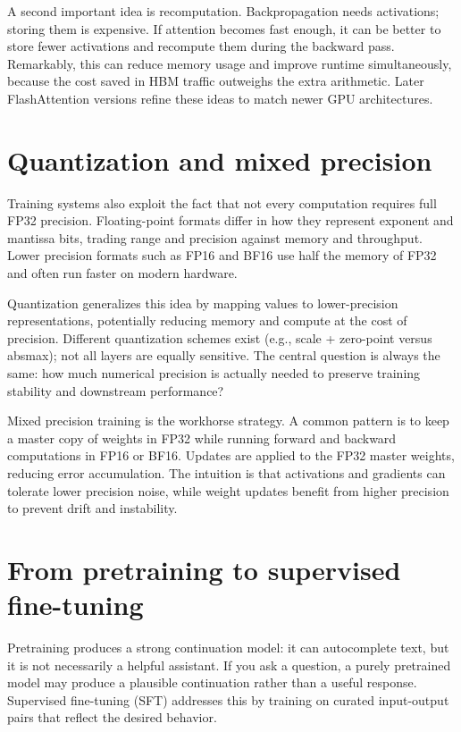 A second important idea is recomputation. Backpropagation needs activations; storing them is expensive. If attention becomes fast enough, it can be better to store fewer activations and recompute them during the backward pass. Remarkably, this can reduce memory usage and improve runtime simultaneously, because the cost saved in HBM traffic outweighs the extra arithmetic. Later FlashAttention versions refine these ideas to match newer GPU architectures.

\section{Quantization and mixed precision}
Training systems also exploit the fact that not every computation requires full FP32 precision. Floating-point formats differ in how they represent exponent and mantissa bits, trading range and precision against memory and throughput. Lower precision formats such as FP16 and BF16 use half the memory of FP32 and often run faster on modern hardware.

Quantization generalizes this idea by mapping values to lower-precision representations, potentially reducing memory and compute at the cost of precision. Different quantization schemes exist (e.g., scale + zero-point versus absmax); not all layers are equally sensitive. The central question is always the same: how much numerical precision is actually needed to preserve training stability and downstream performance?

Mixed precision training is the workhorse strategy. A common pattern is to keep a master copy of weights in FP32 while running forward and backward computations in FP16 or BF16. Updates are applied to the FP32 master weights, reducing error accumulation. The intuition is that activations and gradients can tolerate lower precision noise, while weight updates benefit from higher precision to prevent drift and instability.

\section{From pretraining to supervised fine-tuning}
Pretraining produces a strong continuation model: it can autocomplete text, but it is not necessarily a helpful assistant. If you ask a question, a purely pretrained model may produce a plausible continuation rather than a useful response. Supervised fine-tuning (SFT) addresses this by training on curated input-output pairs that reflect the desired behavior.


